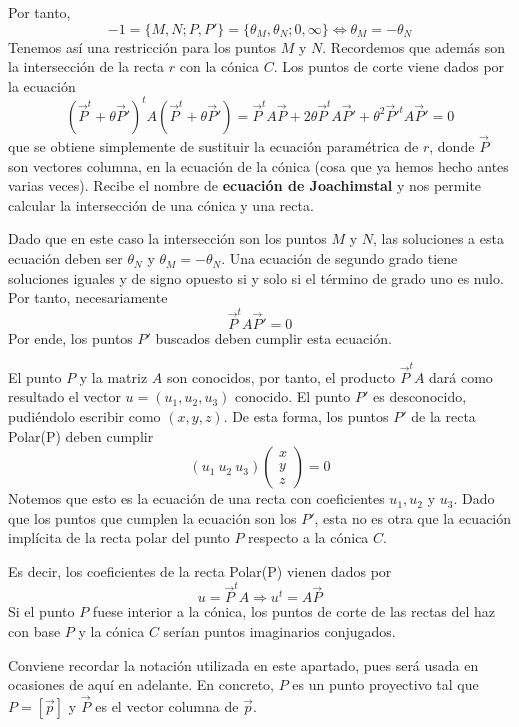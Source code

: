 Por tanto, 
\begin{equation}
-1=\{M,N;P,P'\}=\{\theta_M,\theta_N;0,\infty\}\Leftrightarrow \theta_M=-\theta_N
\end{equation}
Tenemos así una restricción para los puntos $M$ y $N$. Recordemos que además son la intersección de la recta $r$ con la cónica $C$. Los puntos de corte viene dados por la ecuación
\begin{equation}
(\vec{P}^t+\theta \vec{P}')^tA(\vec{P}^t+\theta \vec{P}')=\vec{P}^tA\vec{P}+2\theta \vec{P}^tA\vec{P}'+\theta^2\vec{P}'^tA\vec{P}'=0
\end{equation}
que se obtiene simplemente de sustituir la ecuación paramétrica de $r$, donde $\vec{P}$ son vectores columna, en la ecuación de la cónica (cosa que ya hemos hecho antes varias veces). Recibe el nombre de \textbf{ecuación de Joachimstal} y nos permite calcular la intersección de una cónica y una recta.

Dado que en este caso la intersección son los puntos $M$ y $N$, las soluciones a esta ecuación deben ser $\theta_N$ y $\theta_M=-\theta_N$. Una ecuación de segundo grado tiene soluciones iguales y de signo opuesto si y solo si el término de grado uno es nulo. Por tanto, necesariamente
\begin{equation}\label{C8_eq_puntos_recta_polar}
\vec{P}^tA\vec{P}'=0
\end{equation}
Por ende, los puntos $P'$ buscados deben cumplir esta ecuación.

El punto $P$ y la matriz $A$ son conocidos, por tanto, el producto $\vec{P}^tA$ dará como resultado el vector $u=(u_1, u_2,u_3)$ conocido. El punto $P'$ es desconocido, pudiéndolo escribir como $(x, y,z)$. De esta forma, los puntos $P'$ de la recta Polar(P) deben cumplir
\begin{equation}
(u_1 \ u_2 \ u_3)
\left( \begin{array}{c}
x\\ y\\ z
\end{array}\right) =0
\end{equation}
Notemos que esto es la ecuación de una recta con coeficientes $u_1,u_2$ y $u_3$. Dado que los puntos que cumplen la ecuación son los $P'$, esta no es otra que la ecuación implícita de la recta polar del punto $P$ respecto a la cónica $C$.

Es decir, los coeficientes de la recta Polar(P) vienen dados por
\begin{equation}
u=\vec{P}^tA\Rightarrow u^t=A\vec{P}
\end{equation}
Si el punto $P$ fuese interior a la cónica, los puntos de corte de las rectas del haz con base $P$ y la cónica $C$ serían puntos imaginarios conjugados.
\begin{obs}
	Conviene recordar la notación utilizada en este apartado, pues será usada en ocasiones de aquí en adelante. En concreto, $P$ es un punto proyectivo tal que $P=[\vec{p}]$ y $\vec{P}$ es el vector columna de $\vec{p}$.
\end{obs}

